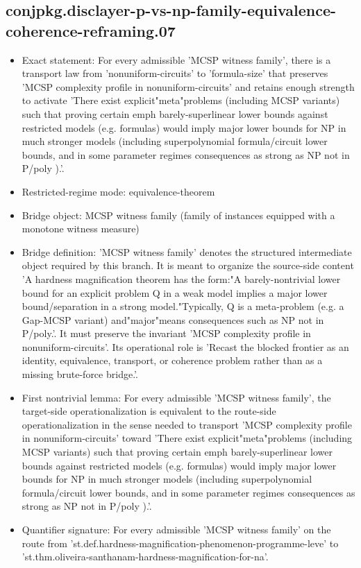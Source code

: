\documentclass[11pt]{article}
\begin{document}
\subsection*{conjpkg.disclayer-p-vs-np-family-equivalence-coherence-reframing.07}
\begin{itemize}
\item Exact statement: For every admissible 'MCSP witness family', there is a transport law from 'nonuniform-circuits' to 'formula-size' that preserves 'MCSP complexity profile in nonuniform-circuits' and retains enough strength to activate 'There exist explicit"meta"problems (including MCSP variants) such that proving certain emph barely-superlinear lower bounds against restricted models (e.g. formulas) would imply major lower bounds for NP in much stronger models (including superpolynomial formula/circuit lower bounds, and in some parameter regimes consequences as strong as NP not in P/poly ).'.
\item Restricted-regime mode: equivalence-theorem
\item Bridge object: MCSP witness family (family of instances equipped with a monotone witness measure)
\item Bridge definition: 'MCSP witness family' denotes the structured intermediate object required by this branch. It is meant to organize the source-side content 'A hardness magnification theorem has the form:"A barely-nontrivial lower bound for an explicit problem Q in a weak model implies a major lower bound/separation in a strong model."Typically, Q is a meta-problem (e.g. a Gap-MCSP variant) and"major"means consequences such as NP not in P/poly.'. It must preserve the invariant 'MCSP complexity profile in nonuniform-circuits'. Its operational role is 'Recast the blocked frontier as an identity, equivalence, transport, or coherence problem rather than as a missing brute-force bridge.'.
\item First nontrivial lemma: For every admissible 'MCSP witness family', the target-side operationalization is equivalent to the route-side operationalization in the sense needed to transport 'MCSP complexity profile in nonuniform-circuits' toward 'There exist explicit"meta"problems (including MCSP variants) such that proving certain emph barely-superlinear lower bounds against restricted models (e.g. formulas) would imply major lower bounds for NP in much stronger models (including superpolynomial formula/circuit lower bounds, and in some parameter regimes consequences as strong as NP not in P/poly ).'.
\item Quantifier signature: For every admissible 'MCSP witness family' on the route from 'st.def.hardness-magnification-phenomenon-programme-leve' to 'st.thm.oliveira-santhanam-hardness-magnification-for-na'.

\end{itemize}
\end{document}
